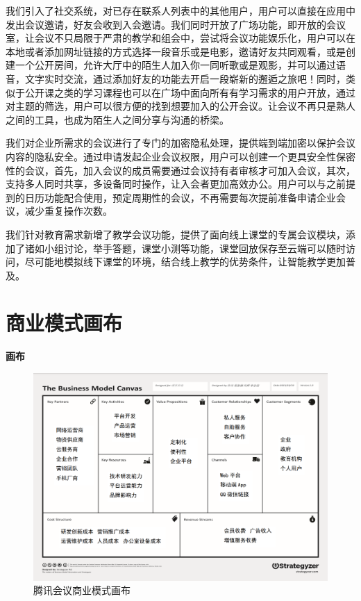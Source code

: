 \documentclass[a4paper,12pt]{article}
\begin{document}
    我们引入了社交系统，对已存在联系人列表中的其他用户，用户可以直接在应用中发出会议邀请，好友会收到入会邀请。我们同时开放了广场功能，即开放的会议室，让会议不只局限于严肃的教学和组会中，尝试将会议功能娱乐化，用户可以在本地或者添加网址链接的方式选择一段音乐或是电影，邀请好友共同观看，或是创建一个公开房间，允许大厅中的陌生人加入你一同听歌或是观影，并可以通过语音，文字实时交流，通过添加好友的功能去开启一段崭新的邂逅之旅吧！同时，类似于公开课之类的学习课程也可以在广场中面向所有有学习需求的用户开放，通过对主题的筛选，用户可以很方便的找到想要加入的公开会议。让会议不再只是熟人之间的工具，也成为陌生人之间分享与沟通的桥梁。

    我们对企业所需求的会议进行了专门的加密隐私处理，提供端到端加密以保护会议内容的隐私安全。通过申请发起企业会议权限，用户可以创建一个更具安全性保密性的会议，首先，加入会议的成员需要通过会议持有者审核才可加入会议，其次，支持多人同时共享，多设备同时操作，让入会者更加高效办公。用户可以与之前提到的日历功能配合使用，预定周期性的会议，不再需要每次提前准备申请企业会议，减少重复操作次数。

    我们针对教育需求新增了教学会议功能，提供了面向线上课堂的专属会议模块，添加了诸如小组讨论，举手答题，课堂小测等功能，课堂回放保存至云端可以随时访问，尽可能地模拟线下课堂的环境，结合线上教学的优势条件，让智能教学更加普及。


    \section{商业模式画布}
    \textbf{画布}
    \begin{figure}[H]
        \centering
        \includegraphics[scale=0.3]{腾讯会议画布.png}
        \caption{腾讯会议商业模式画布}
        \label{figure}
    \end{figure}
\end{document}
